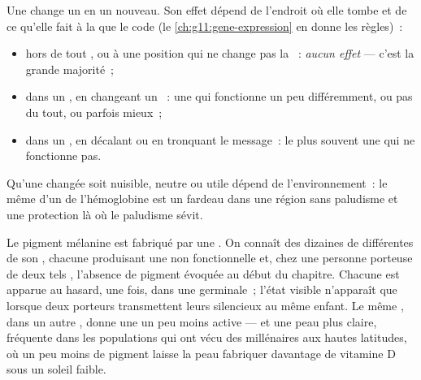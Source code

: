 \begin{proposition}\label{prop:g11:mutations:consequences}
Une  change un  en un  nouveau. Son effet dépend de
l'endroit où elle tombe et de ce qu'elle fait à la  que le 
code (le \cref{ch:g11:gene-expression} en donne les règles)~:
\begin{itemize}
  \item hors de tout , ou à une position qui ne change pas la
        ~: \emph{aucun effet} --- c'est la grande majorité~;
  \item dans un , en changeant un ~: une  qui
        fonctionne un peu différemment, ou pas du tout, ou parfois
        mieux~;
  \item dans un , en décalant ou en tronquant le message~: le plus
        souvent une  qui ne fonctionne pas.
\end{itemize}
Qu'une  changée soit nuisible, neutre ou utile dépend de
l'environnement~: le même  d'un  de l'hémoglobine est un
fardeau dans une région sans paludisme et une protection là où le
paludisme sévit.
\end{proposition}
\admitted

\begin{example}\label{ex:g11:mutations:pigment}
Le pigment mélanine est fabriqué par une . On connaît des
dizaines de  différentes de son , chacune produisant une
 non fonctionnelle et, chez une personne porteuse de deux tels
, l'absence de pigment évoquée au début du chapitre. Chacune est
apparue au hasard, une fois, dans une  germinale~; l'état
visible n'apparaît que lorsque deux porteurs transmettent leurs 
silencieux au même enfant. Le même , dans un autre , donne
une  un peu moins active --- et une peau plus claire, fréquente
dans les populations qui ont vécu des millénaires aux hautes latitudes,
où un peu moins de pigment laisse la peau fabriquer davantage de
vitamine D sous un soleil faible.
\end{example}


